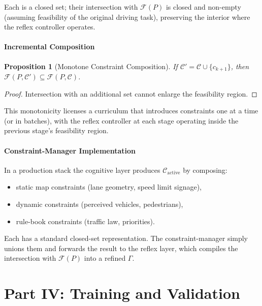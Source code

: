 \documentclass[11pt,twocolumn]{article}
\newtheorem{proposition}[theorem]{Proposition}
\theoremstyle{definition}
\theoremstyle{remark}
\newcommand{\Feas}{\mathcal{F}}
\newcommand{\cC}{\mathcal{C}}
\begin{document}
Each is a closed set; their intersection with $\Feas(P)$ is closed and non-empty (assuming feasibility of the original driving task), preserving the interior where the reflex controller operates.

\subsection{Incremental Composition}

\begin{proposition}[Monotone Constraint Composition]\label{prop:mono}
If $\cC' = \cC \cup \{c_{k+1}\}$, then $\Feas(P, \cC') \subseteq \Feas(P, \cC)$.
\end{proposition}

\begin{proof}
Intersection with an additional set cannot enlarge the feasibility region.
\end{proof}

This monotonicity licenses a curriculum that introduces constraints one at a time (or in batches), with the reflex controller at each stage operating inside the previous stage's feasibility region.

\subsection{Constraint-Manager Implementation}

In a production stack the cognitive layer produces $\cC_{\mathrm{active}}$ by composing:
\begin{itemize}[leftmargin=*,itemsep=2pt]
\item static map constraints (lane geometry, speed limit signage),
\item dynamic constraints (perceived vehicles, pedestrians),
\item rule-book constraints (traffic law, priorities).
\end{itemize}

Each has a standard closed-set representation. The constraint-manager simply unions them and forwards the result to the reflex layer, which compiles the intersection with $\Feas(P)$ into a refined $\Gamma$.

\bigskip

\part*{Part IV: Training and Validation}
\end{document}
